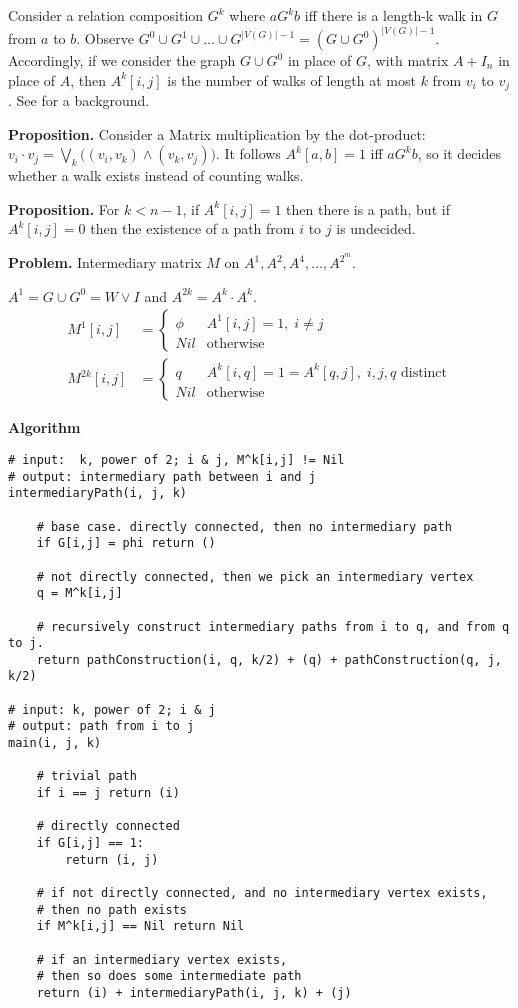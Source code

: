 Consider a relation composition $G^k$ where $a G^k b$ iff there is a length-k walk in $G$ from $a$ to $b$. Observe $G^0 \cup G^1 \cup \dots \cup G^{|V(G)|-1} = (G \cup G^0)^{|V(G)|-1}$. Accordingly, if we consider the graph $G \cup G^0$ in place of $G$, with matrix $A + I_n$ in place of $A$, then $A^k[i,j]$ is the number of walks of length at most $k$ from $v_i$ to $v_j$. See \cite{discreteHandbook} for a background.

\textbf{Proposition.} Consider a Matrix multiplication by the dot-product: $v_i \cdot v_j = \bigvee_k \big ( (v_i, v_k) \wedge (v_k, v_j) \big )$. It follows $A^k[a,b] = 1$ iff $a G^k b$, so it decides whether a walk exists instead of counting walks.

\textbf{Proposition.} For $k < n-1$, if $A^k[i,j] = 1$ then there is a path, but if $A^k[i,j] = 0$ then the existence of a path from $i$ to $j$ is undecided.

\textbf{Problem.} Intermediary matrix $M$ on $A^1, A^2, A^4, \dots, A^{2^m}$.

$A^1 = G \cup G^0 = W \vee I$ and $A^{2k} = A^k \cdot A^k$.
\begin{align*}
M^1[i,j] &= \begin{cases} 
      \phi & A^1[i,j]=1, \; i \neq j \\
      Nil & \text{otherwise}
    \end{cases} \\
M^{2k}[i,j] &= \begin{cases} 
      q & A^k[i,q] = 1 = A^k[q,j], \; i,j,q \text{ distinct} \\
      Nil & \text{otherwise}
    \end{cases}
\end{align*}

\textbf{Algorithm}
\begin{verbatim}
# input:  k, power of 2; i & j, M^k[i,j] != Nil
# output: intermediary path between i and j
intermediaryPath(i, j, k)

    # base case. directly connected, then no intermediary path
    if G[i,j] = phi return ()
    
    # not directly connected, then we pick an intermediary vertex
    q = M^k[i,j]
    
    # recursively construct intermediary paths from i to q, and from q to j.
    return pathConstruction(i, q, k/2) + (q) + pathConstruction(q, j, k/2)

# input: k, power of 2; i & j
# output: path from i to j
main(i, j, k)

    # trivial path
    if i == j return (i)

    # directly connected
    if G[i,j] == 1:
        return (i, j)

    # if not directly connected, and no intermediary vertex exists,
    # then no path exists
    if M^k[i,j] == Nil return Nil

    # if an intermediary vertex exists,
    # then so does some intermediate path
    return (i) + intermediaryPath(i, j, k) + (j)
\end{verbatim}

